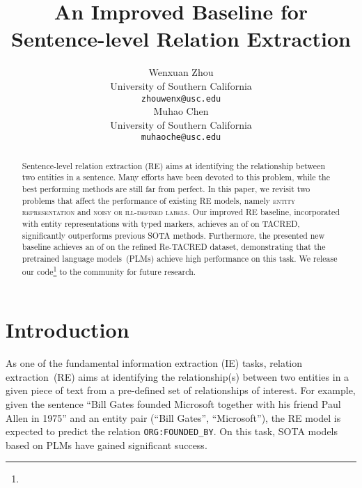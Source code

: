 \documentclass[11pt,a4paper]{article}
\title{An Improved Baseline for Sentence-level Relation Extraction}
\author{Wenxuan Zhou \\
  University of Southern California \\
  \texttt{zhouwenx@usc.edu} \\\And
  Muhao Chen \\
  University of Southern California \\
  \texttt{muhaoche@usc.edu} \\}
\date{}
\begin{document}
\maketitle

\begin{abstract}
Sentence-level relation extraction (RE) aims at identifying the relationship between two entities in a sentence.
Many efforts have been devoted to this problem, while the best performing methods are still far from perfect.
In this paper, we revisit two problems that affect the performance of existing RE models, namely \textsc{entity representation} and \textsc{noisy or ill-defined labels}.
Our improved RE baseline, incorporated with entity representations with typed markers, achieves an  of  on TACRED, significantly outperforms previous SOTA methods.
Furthermore, the presented new baseline achieves an  of  on the refined Re-TACRED dataset, demonstrating that the pretrained language models~(PLMs) achieve high performance on this task.
We release our code\footnote{} to the community for future research.


\end{abstract}

\section{Introduction}

As one of the fundamental information extraction (IE) tasks,
relation extraction~(RE) aims at identifying the relationship(s) between two entities in a given piece of text from a pre-defined set of relationships of interest.
For example, given the sentence ``Bill Gates founded Microsoft together with his friend Paul Allen in 1975'' and an entity pair (``Bill Gates'', ``Microsoft''), the RE model is expected to predict the relation \texttt{ORG:FOUNDED\_BY}.
On this task, SOTA models based on PLMs \cite{devlin-etal-2019-bert,joshi-etal-2020-spanbert} have gained significant success.
\end{document}
